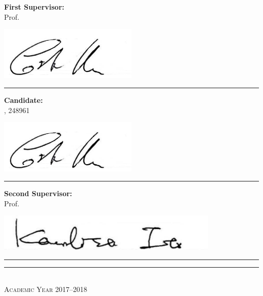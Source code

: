 \begin{titlepage}
\begin{minipage}[3cm]{.4\textwidth}
\textbf{First Supervisor:} \\ \smallskip
Prof. \myProf

\smallskip
{\hspace{0.25\textwidth}\includegraphics[width=0.5\textwidth]{Images/firma_manes}}
\rule[0.4cm]{\textwidth}{1pt}
\end{minipage}
\hfill
\begin{minipage}[3cm]{.4\textwidth}
\textbf{Candidate:} \\ \smallskip
\myName, 248961

\smallskip
{\hspace{0.25\textwidth}\includegraphics[width=0.5\textwidth]{Images/firma_manes}}
\rule[.4cm]{\textwidth}{1pt}
\end{minipage}

\vspace{.01\textheight}

\begin{minipage}[3cm]{.4\textwidth}
\textbf{Second Supervisor:} \\ \smallskip
Prof. \mySupervisor

\smallskip
{\hspace{0.1\textwidth}\includegraphics[width=0.8\textwidth]{Images/firma_ito}}
\rule[.4cm]{\textwidth}{1pt}
\end{minipage}
\hfill

\begin{center}
\vfill
\rule{\textwidth}{1pt}\\
{\scshape Academic Year 2017--2018}


\end{center}
\end{titlepage}